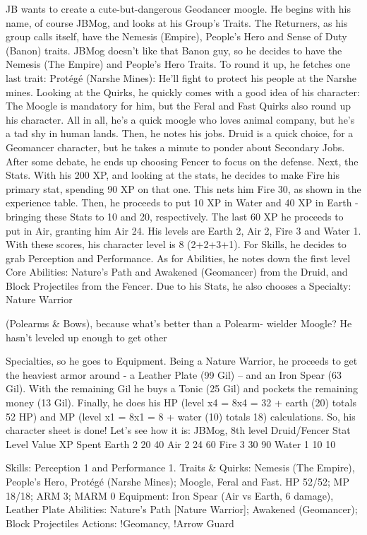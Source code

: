 JB wants to create a cute-but-dangerous Geodancer
moogle. He begins with his name, of course JBMog, and
looks at his Group's Traits. The Returners, as his group
calls itself, have the Nemesis (Empire), People's Hero and
Sense of Duty (Banon) traits. JBMog doesn't like that
Banon guy, so he decides to have the Nemesis (The
Empire) and People's Hero Traits. To round it up, he
fetches one last trait: Protégé (Narshe Mines): He'll fight
to protect his people at the Narshe mines.
Looking at the Quirks, he quickly comes with a
good idea of his character: The Moogle is mandatory for
him, but the Feral and Fast Quirks also round up his
character. All in all, he's a quick moogle who loves animal
company, but he's a tad shy in human lands.
Then, he notes his jobs. Druid is a quick choice,
for a Geomancer character, but he takes a minute to
ponder about Secondary Jobs. After some debate, he ends
up choosing Fencer to focus on the defense.
Next, the Stats. With his 200 XP, and looking at
the stats, he decides to make Fire his primary stat,
spending 90 XP on that one. This nets him Fire 30, as
shown in the experience table. Then, he proceeds to put
10 XP in Water and 40 XP in Earth - bringing these Stats
to 10 and 20, respectively. The last 60 XP he proceeds to
put in Air, granting him Air 24. His levels are Earth 2, Air
2, Fire 3 and Water 1. With these scores, his character
level is 8 (2+2+3+1). For Skills, he decides to grab
Perception and Performance.
As for Abilities, he notes down the first level Core
Abilities: Nature's Path and Awakened (Geomancer) from
the Druid, and Block Projectiles from the Fencer. Due to
his Stats, he also chooses a Specialty: Nature Warrior

(Polearms \& Bows), because what’s better than a Polearm-
wielder Moogle? He hasn't leveled up enough to get other

Specialties, so he goes to Equipment.
Being a Nature Warrior, he proceeds to get the
heaviest armor around - a Leather Plate (99 Gil) – and an
Iron Spear (63 Gil). With the remaining Gil he buys a
Tonic (25 Gil) and pockets the remaining money (13 Gil).
Finally, he does his HP (level x4 = 8x4 = 32 + earth (20)
totals 52 HP) and MP (level x1 = 8x1 = 8 + water (10)
totals 18) calculations.
So, his character sheet is done! Let's see how it is:
JBMog, 8th level Druid/Fencer
Stat Level Value XP Spent
Earth 2 20 40
Air 2 24 60
Fire 3 30 90
Water 1 10 10

Skills: Perception 1 and Performance 1.
Traits \& Quirks: Nemesis (The Empire), People's Hero,
Protégé (Narshe Mines); Moogle, Feral and Fast.
HP 52/52; MP 18/18; ARM 3; MARM 0
Equipment: Iron Spear (Air vs Earth, 6 damage), Leather
Plate
Abilities: Nature's Path [Nature Warrior]; Awakened
(Geomancer); Block Projectiles
Actions: !Geomancy, !Arrow Guard